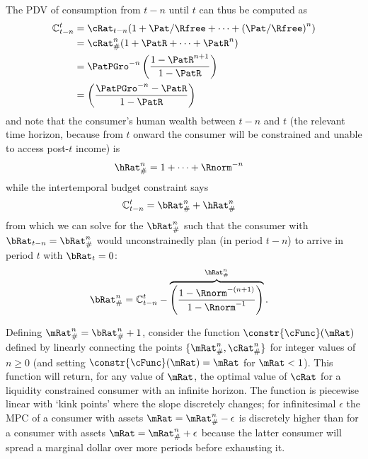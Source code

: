 \documentclass[\econtexRoot/BufferStockTheory]{subfiles}
\begin{document}
The PDV of consumption from $t-n$ until $t$ can thus be computed as
\begin{equation}\begin{gathered}\begin{aligned}
  \mathbb{C}_{t-n}^{t}  & = \cRat_{t-n}(1+\Pat/\Rfree+ \cdots + {(\Pat/\Rfree)}^{n}) \notag
  \\  & = \cRat_{\#}^{n}(1+\PatR+ \cdots + \PatR^{n}) \notag
  \\  & = \PatPGro^{-n}\left(\frac{1-\PatR^{n+1}}{1-\PatR}\right) \label{PDVc}
  \\  & = \left(\frac{\PatPGro^{-n}-\PatR}{1-\PatR}\right) 
\end{aligned}\end{gathered}\end{equation}
and note that the consumer's human wealth between $t-n$ and $t$ (the relevant
time horizon, because from $t$ onward the consumer will be constrained
and unable to access post-$t$ income) is
\begin{equation}\begin{gathered}\begin{aligned}
  \hRat_{\#}^{n}  & = 1+ \cdots +\Rnorm^{-n}
\end{aligned}\end{gathered}\end{equation}
while the intertemporal budget constraint says
\begin{eqnarray*}
  \mathbb{C}_{t-n}^{t}  & = \bRat_{\#}^{n}+\hRat_{\#}^{n}
\end{eqnarray*}
from which we can solve for the $\bRat_{\#}^{n}$ such that
the consumer with $\bRat_{t-n} = \bRat_{\#}^{n}$ would
unconstrainedly plan (in period $t-n$) to arrive in period $t$ with
$\bRat_{t}=0$:
\begin{equation}\begin{gathered}\begin{aligned}
  \bRat_{\#}^{n} & =  \mathbb{C}_{t-n}^{t} - \overbrace{\left(\frac{1-\Rnorm^{-(n+1)}}{1-\Rnorm^{-1}}\right)}^{\hRat_{\#}^{n}} \label{eq:bPound}.
\end{aligned}\end{gathered}\end{equation}

Defining $\mRat_{\#}^{n}=\bRat_{\#}^{n}+1$, consider the function
$\constr{\cFunc}(\mRat)$ defined by linearly connecting the points
$\{\mRat_{\#}^{n},\cRat_{\#}^{n}\}$ for integer values of $n \geq 0$
(and setting $\constr{\cFunc}(\mRat)=\mRat$ for $\mRat<1$).  This
function will return, for any value of $\mRat$, the optimal value of
$\cRat$ for a liquidity constrained consumer with an infinite horizon.
The function is piecewise linear with `kink points' where the slope
discretely changes; for infinitesimal $\epsilon$ the MPC of a
consumer with assets $\mRat=\mRat_{\#}^{n}-\epsilon$ is discretely
higher than for a consumer with assets $\mRat=\mRat_{\#}^{n}+\epsilon$
because the latter consumer will spread a marginal dollar over more
periods before exhausting it.
\end{document}
